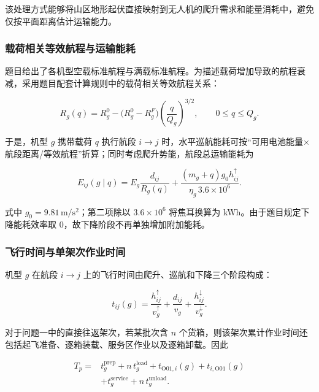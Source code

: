 \documentclass[bwprint,fontset=fandol]{gmcmthesis}
\begin{document}
该处理方式能够将山区地形起伏直接映射到无人机的爬升需求和能量消耗中，避免仅按平面距离估计运输能力。

\subsubsection{载荷相关等效航程与运输能耗}

题目给出了各机型空载标准航程与满载标准航程。为描述载荷增加导致的航程衰减，采用题目配套计算规则中的载荷相关等效航程关系：

\begin{equation}
R_g(q)=R_g^0-\bigl(R_g^0-R_g^F\bigr)
\left(\frac{q}{Q_g}\right)^{3/2},\qquad 0\le q\le Q_g.
\label{eq:q1-range}
\end{equation}

于是，机型 $g$ 携带载荷 $q$ 执行航段 $i\to j$ 时，水平巡航能耗可按“可用电池能量$\times$航段距离/等效航程”折算；同时考虑爬升势能，航段总运输能耗为

\begin{equation}
E_{ij}(g\mid q)
= E_g\frac{d_{ij}}{R_g(q)}
+\frac{(m_g+q)g_0h_{ij}^{\uparrow}}{\eta_g\,3.6\times 10^6}.
\label{eq:q1-segment-energy}
\end{equation}

式中 $g_0=9.81\,\mathrm{m}/\mathrm{s}^{2}$；第二项除以 $3.6\times10^6$ 将焦耳换算为 kWh。由于题目规定下降能耗效率取 0，故下降阶段不再单独增加附加能耗。

\subsubsection{飞行时间与单架次作业时间}

机型 $g$ 在航段 $i\to j$ 上的飞行时间由爬升、巡航和下降三个阶段构成：

\begin{equation}
t_{ij}(g)
=\frac{h_{ij}^{\uparrow}}{v_g^{\uparrow}}
+\frac{d_{ij}}{v_g}
+\frac{h_{ij}^{\downarrow}}{v_g^{\downarrow}}.
\label{eq:q1-flight-time}
\end{equation}

对于问题一中的直接往返架次，若某批次含 $n$ 个货箱，则该架次累计作业时间还包括起飞准备、逐箱装载、服务区作业以及逐箱卸载。因此

\begin{equation}
\begin{aligned}
T_p={}&t_g^{\mathrm{prep}}+n\,t_g^{\mathrm{load}}
+t_{\mathrm{O01},i}(g)+t_{i,\mathrm{O01}}(g)\\
&+t_g^{\mathrm{service}}+n\,t_g^{\mathrm{unload}}.
\end{aligned}
\label{eq:q1-operation-time}
\end{equation}
\end{document}
